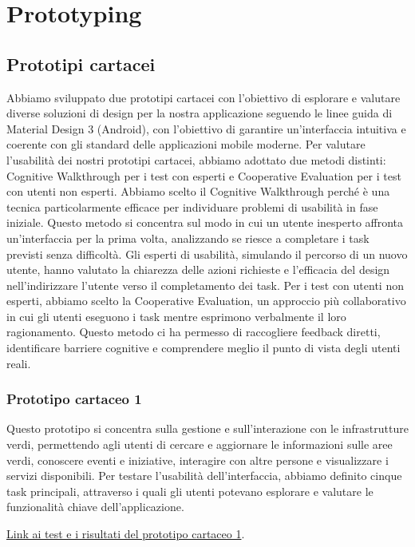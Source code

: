 \chapter{Prototyping}
\setcounter{page}{10}
\section{Prototipi cartacei}
Abbiamo sviluppato due prototipi cartacei con l'obiettivo di esplorare e valutare diverse soluzioni di design per la nostra applicazione seguendo le linee guida di Material Design 3 (Android), con l'obiettivo di garantire un'interfaccia intuitiva e coerente con gli standard delle applicazioni mobile moderne. 
Per valutare l'usabilità dei nostri prototipi cartacei, abbiamo adottato due metodi distinti: Cognitive Walkthrough per i test con esperti e Cooperative Evaluation per i test con utenti non esperti.
Abbiamo scelto il Cognitive Walkthrough perché è una tecnica particolarmente efficace per individuare problemi di usabilità in fase iniziale. Questo metodo si concentra sul modo in cui un utente inesperto affronta un’interfaccia per la prima volta, analizzando se riesce a completare i task previsti senza difficoltà. Gli esperti di usabilità, simulando il percorso di un nuovo utente, hanno valutato la chiarezza delle azioni richieste e l’efficacia del design nell’indirizzare l’utente verso il completamento dei task.
Per i test con utenti non esperti, abbiamo scelto la Cooperative Evaluation, un approccio più collaborativo in cui gli utenti eseguono i task mentre esprimono verbalmente il loro ragionamento. Questo metodo ci ha permesso di raccogliere feedback diretti, identificare barriere cognitive e comprendere meglio il punto di vista degli utenti reali.

\subsection{Prototipo cartaceo 1}
Questo prototipo si concentra sulla gestione e sull'interazione con le infrastrutture verdi, permettendo agli utenti di cercare e aggiornare le informazioni sulle aree verdi, conoscere eventi e iniziative, interagire con altre persone e visualizzare i servizi disponibili. Per testare l'usabilità dell'interfaccia, abbiamo definito cinque task principali, attraverso i quali gli utenti potevano esplorare e valutare le funzionalità chiave dell'applicazione.

\href{https://docs.google.com/document/d/1TPPLwieViGN1jy8PAt7PTH-LxQp3Fji3LhYYNQ60Oz4/edit?tab=t.0#heading=h.8hgxc9gkc90q}{Link ai test e i risultati del prototipo cartaceo 1}.


